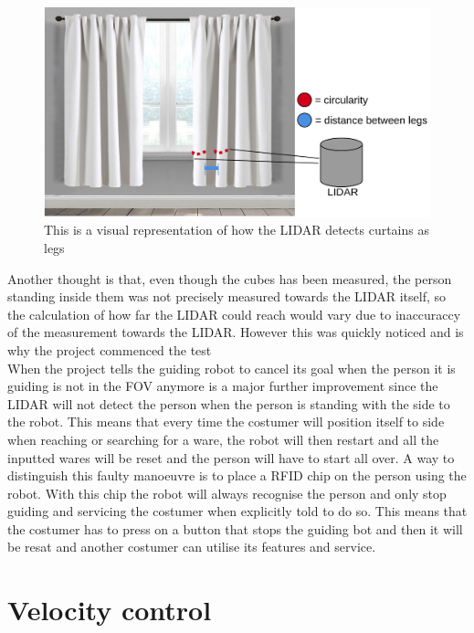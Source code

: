 \begin{figure}[H]
    \centering
    \includegraphics[width=1\textwidth]{figures/curtain.png} 
    \caption{This is a visual representation of how the LIDAR detects curtains as legs}
    \label{fig:curtains}
\end{figure}

Another thought is that, even though the cubes has been measured, the person standing inside them was not precisely measured towards the LIDAR itself, so the calculation of how far the LIDAR could reach would vary due to inaccuraccy of the measurement towards the LIDAR. However this was quickly noticed and is why the project commenced the test %
\\
When the project tells the guiding robot to cancel its goal when the person it is guiding is not in the FOV anymore is a major further improvement since the LIDAR will not detect the person when the person is standing with the side to the robot. This means that every time the costumer will position itself to side when reaching or searching for a ware, the robot will then restart and all the inputted wares will be reset and the person will have to start all over. A way to distinguish this faulty manoeuvre is to place a RFID chip on the person using the robot. With this chip the robot will always recognise the person and only stop guiding and servicing the costumer when explicitly told to do so. This means that the costumer has to press on a button that stops the guiding bot and then it will be resat and another costumer can utilise its features and service. 

\section{Velocity control}

